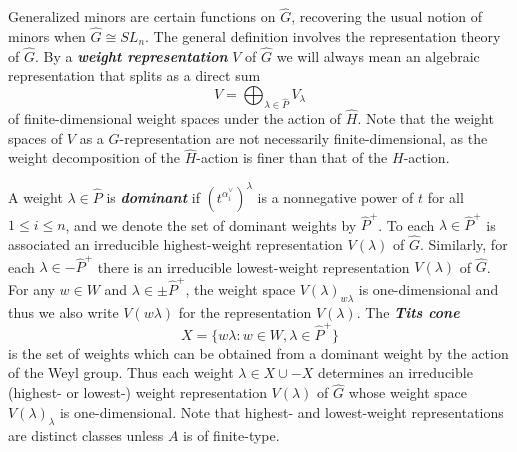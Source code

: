 \documentclass[12pt]{amsart}
\newcommand{\newword}[1]{\textbf{\emph{#1}}}
\theoremstyle{remark}
\numberwithin{equation}{section}
\numberwithin{figure}{section}
\begin{document}
Generalized minors are certain functions on $\widehat{G}$, recovering the usual notion of minors when $\widehat{G} \cong SL_n$.
The general definition involves the representation theory of $\widehat{G}$.
By a \newword{weight representation} $V$ of $\widehat{G}$ we will always mean an algebraic representation that splits as a direct sum
\[
  V = \bigoplus_{\lambda \in \widehat{P}} V_\lambda
\]
of finite-dimensional weight spaces under the action of $\widehat{H}$.
Note that the weight spaces of $V$ as a $G$-representation are not necessarily finite-dimensional, as the weight decomposition of the $\widehat{H}$-action is finer than that of the $H$-action.

A weight $\lambda \in \widehat{P}$ is \newword{dominant} if $(t^{\alpha_i^\vee})^\lambda$ is a nonnegative power of $t$ for all $1 \leq i \leq n$, and we denote the set of dominant weights by $\widehat{P}^+$.
To each $\lambda \in \widehat{P}^+$ is associated an irreducible highest-weight representation $V(\lambda)$ of $\widehat{G}$.
Similarly, for each $\lambda \in -\widehat{P}^+$ there is an irreducible lowest-weight representation $V(\lambda)$ of $\widehat{G}$.
For any $w\in W$ and $\lambda\in\pm\widehat{P}^+$, the weight space $V(\lambda)_{w\lambda}$ is one-dimensional and thus we also write $V(w\lambda)$ for the representation $V(\lambda)$.
The \newword{Tits cone} $$X = \{w\lambda : w \in W, \lambda \in \widehat{P}^+\}$$ is the set of weights which can be obtained from a dominant weight by the action of the Weyl group.
Thus each weight $\lambda\in X \cup -X$ determines an irreducible (highest- or lowest-) weight representation $V(\lambda)$ of $\widehat{G}$ whose weight space $V(\lambda)_\lambda$ is one-dimensional.
Note that highest- and lowest-weight representations are distinct classes unless $A$ is of finite-type.
\end{document}
